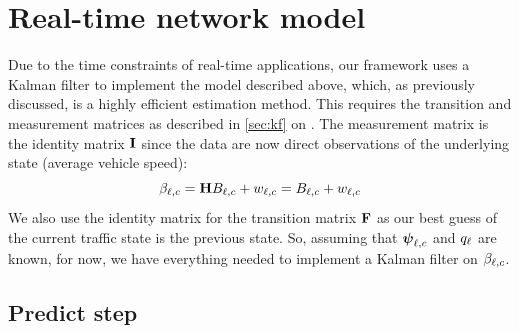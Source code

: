 \section{Real-time network model}
\label{sec:nw_realtime}

Due to the time constraints of real-time applications, our framework uses a Kalman filter to implement the model described above, which, as previously discussed, is a highly efficient estimation method. This requires the transition and measurement matrices as described in \cref{sec:kf} on . The measurement matrix is the identity matrix $\mathbf{I}$ since the data are now direct observations of the underlying state (average vehicle speed):
\begin{equation}
\label{eq:kf_meas_identity}
\beta_{\ell,c} = \mathbf{H}B_{\ell,c} + w_{\ell,c} = B_{\ell,c} + w_{\ell,c}
\end{equation}
We also use the identity matrix for the transition matrix $\mathbf{F}$ as our best guess of the current traffic state is the previous state. So, assuming that $\mathbf{\boldsymbol{\psi}}_{\ell,c}$ and $q_{\ell}$ are known, for now, we have everything needed to implement a Kalman filter on $\beta_{\ell,c}$.


\subsection{Predict step}
\label{sec:kf_predict}

